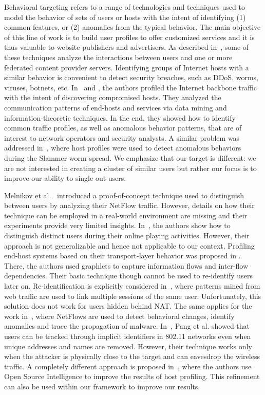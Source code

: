 \documentclass[10pt,conference,compsocconf,letterpaper]{IEEEtran}
\begin{document}
Behavioral targeting refers to a range of technologies and techniques
used to model the behavior of sets of users or hosts with 
the intent of identifying (1) common features, or (2) anomalies from the typical 
behavior. The main objective of this line of work is to build user profiles 
to offer customized services and it is thus valuable to website publishers and 
advertisers. 
As described in~\cite{Yan2009}, some of these techniques analyze the 
interactions  between users and one or more federated content provider servers. 
Identifying groups of Internet hosts with a similar behavior is convenient 
to detect security breaches, such as DDoS, worms, viruses,
botnets, etc. In~\cite{Xu2005a} and \cite{Xu2008}, the authors profiled 
the Internet backbone traffic with the intent of discovering compromised hosts. 
They analyzed the communication patterns
of end-hosts and services via data mining and
information-theoretic techniques. In the end, they showed how to identify common
traffic profiles, as well as anomalous behavior patterns, that are of
interest to network operators and security analysts. A similar problem
was addressed in~\cite{Wei2006}, where host profiles were used to detect 
anomalous behaviors during the Slammer worm spread. 
We emphasize that our target is different:  we are not interested in creating
a cluster of similar users but rather our focus is to improve our ability
to single out users.

Melnikov et al.~\cite{Melnikov2010a} introduced a proof-of-concept
technique used to distinguish between users by analyzing their NetFlow traffic. 
However, details on how their technique can be
employed in a real-world environment are missing and their 
experiments provide very limited insights. 
In~\cite{Chen2007}, the authors show how to distinguish distinct users
during their online playing activities. However, their approach is not
generalizable and hence not applicable to our context. 
Profiling end-host systems based on their transport-layer behavior 
was proposed in \cite{Karagiannis2007}. There, the authors used graphlets to capture
information flows and inter-flow dependencies. Their basic technique though cannot
be used to re-identify users later on. Re-identification is explicitly considered 
in~\cite{Herrmann2012}, where patterns mined from web traffic are 
used to link multiple sessions of the same user. Unfortunately, this solution 
does not work for users hidden behind NAT.  The same applies for the 
work in~\cite{McHugh2008}, where NetFlows are used to detect behavioral
changes, identify anomalies and trace the propagation of
malware. 
In~\cite{Pang2007}, Pang et al. showed that users can be tracked 
through implicit identifiers in 802.11 networks even when
unique addresses and names are removed. However, their technique
works only when the attacker is physically close to the target and can
eavesdrop the wireless traffic.
A completely different approach is proposed in~\cite{Trestian2008},
where the authors use Open Source Intelligence to improve the results
of host profiling. This refinement can also be used within our framework to 
improve our results. 
\end{document}

